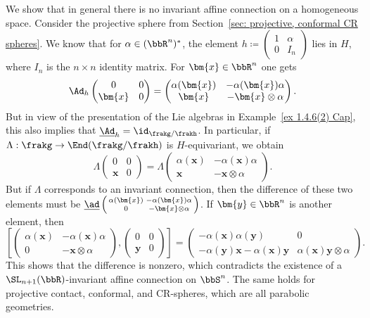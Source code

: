 \begin{example}
    We show that in general there is no invariant affine connection on a homogeneous space. Consider the projective sphere from Section~\ref{sec: projective, conformal CR spheres}. We know that for $\alpha\in (\bbR^n)^\ast$, the element $h\coloneqq \left(\begin{smallmatrix}
        1&\alpha \\ 0& I_n
    \end{smallmatrix}\right)$
    lies in $H$, where $I_n$ is the $n\times n$ identity matrix. For $\bm{x}\in\bbR^n$ one gets 
    \[\Ad_h \begin{pmatrix}
        0&0\\ \bm{x}&0
    \end{pmatrix}=
    \begin{pmatrix}
        \alpha(\bm{x})&-\alpha(\bm{x})\alpha\\
        \bm{x}&-\bm{x}\otimes\alpha 
    \end{pmatrix}.
    \]
    But in view of the presentation of the Lie algebras in Example~\ref{ex 1.4.6(2) Cap}, this also implies that $\underline{\Ad}_h=\id_{\frakg\slash\frakh}$. In particular, if $\Lambda:\frakg\to \End(\frakg\slash\frakh)$ is $H$-equivariant, we obtain 
    \[\Lambda \begin{pmatrix}
        0&0\\\bm{x}&0
    \end{pmatrix}=
    \Lambda \begin{pmatrix}
        \alpha(\bm{x})&-\alpha(\bm{x})\alpha\\
        \bm{x}&-\bm{x}\otimes\alpha 
    \end{pmatrix}.\]
    But if $\Lambda$ corresponds to an invariant connection, then the difference of these two elements must be $\underline{\ad}\left(\begin{smallmatrix}
        \alpha(\bm{x})&-\alpha(\bm{x})\alpha\\
        0& -\bm{x}\otimes\alpha
    \end{smallmatrix}\right)$. If $\bm{y}\in\bbR^n$ is another element, then 
    \[\left[
    \begin{pmatrix}
        \alpha(\bm{x})&-\alpha(\bm{x})\alpha\\
        0& -\bm{x}\otimes\alpha
    \end{pmatrix},
    \begin{pmatrix}
        0&0\\\bm{y}&0
    \end{pmatrix}
    \right]=
    \begin{pmatrix}
        -\alpha(\bm{x})\alpha(\bm{y})&0\\
        -\alpha(\bm{y})\bm{x}-\alpha(\bm{x})\bm{y}&\alpha(\bm{x})\bm{y}\otimes\alpha
    \end{pmatrix}.
    \]
    This shows that the difference is nonzero, which contradicts the existence of a $\SL_{n+1}(\bbR)$-invariant affine connection on $\bbS^n$. The same holds for projective contact, conformal, and CR-spheres, which are all parabolic geometries.
\end{example}








